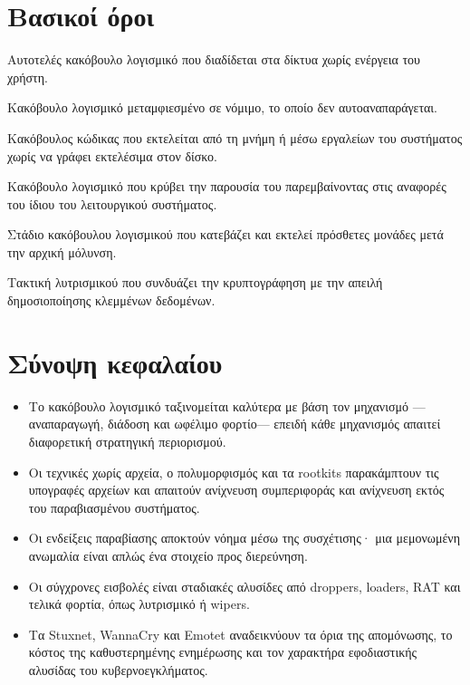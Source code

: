 \documentclass[11pt,openany]{book}
\begin{document}
\section*{Βασικοί όροι}
\begin{description}[style=nextline,leftmargin=1.2em]
  \item[Σκουλήκι (worm)] Αυτοτελές κακόβουλο λογισμικό που διαδίδεται στα δίκτυα χωρίς ενέργεια του χρήστη.
  \item[Δούρειος ίππος] Κακόβουλο λογισμικό μεταμφιεσμένο σε νόμιμο, το οποίο δεν αυτοαναπαράγεται.
  \item[Κακόβουλο λογισμικό χωρίς αρχεία] Κακόβουλος κώδικας που εκτελείται από τη μνήμη ή μέσω εργαλείων του συστήματος χωρίς να γράφει εκτελέσιμα στον δίσκο.
  \item[Rootkit] Κακόβουλο λογισμικό που κρύβει την παρουσία του παρεμβαίνοντας στις αναφορές του ίδιου του λειτουργικού συστήματος.
  \item[Loader] Στάδιο κακόβουλου λογισμικού που κατεβάζει και εκτελεί πρόσθετες μονάδες μετά την αρχική μόλυνση.
  \item[Διπλός εκβιασμός] Τακτική λυτρισμικού που συνδυάζει την κρυπτογράφηση με την απειλή δημοσιοποίησης κλεμμένων δεδομένων.
\end{description}

\section*{Σύνοψη κεφαλαίου}
\begin{itemize}
  \item Το κακόβουλο λογισμικό ταξινομείται καλύτερα με βάση τον μηχανισμό —αναπαραγωγή, διάδοση και ωφέλιμο φορτίο— επειδή κάθε μηχανισμός απαιτεί διαφορετική στρατηγική περιορισμού.
  \item Οι τεχνικές χωρίς αρχεία, ο πολυμορφισμός και τα rootkits παρακάμπτουν τις υπογραφές αρχείων και απαιτούν ανίχνευση συμπεριφοράς και ανίχνευση εκτός του παραβιασμένου συστήματος.
  \item Οι ενδείξεις παραβίασης αποκτούν νόημα μέσω της συσχέτισης· μια μεμονωμένη ανωμαλία είναι απλώς ένα στοιχείο προς διερεύνηση.
  \item Οι σύγχρονες εισβολές είναι σταδιακές αλυσίδες από droppers, loaders, RAT και τελικά φορτία, όπως λυτρισμικό ή wipers.
  \item Τα Stuxnet, WannaCry και Emotet αναδεικνύουν τα όρια της απομόνωσης, το κόστος της καθυστερημένης ενημέρωσης και τον χαρακτήρα εφοδιαστικής αλυσίδας του κυβερνοεγκλήματος.
\end{itemize}
\end{document}
